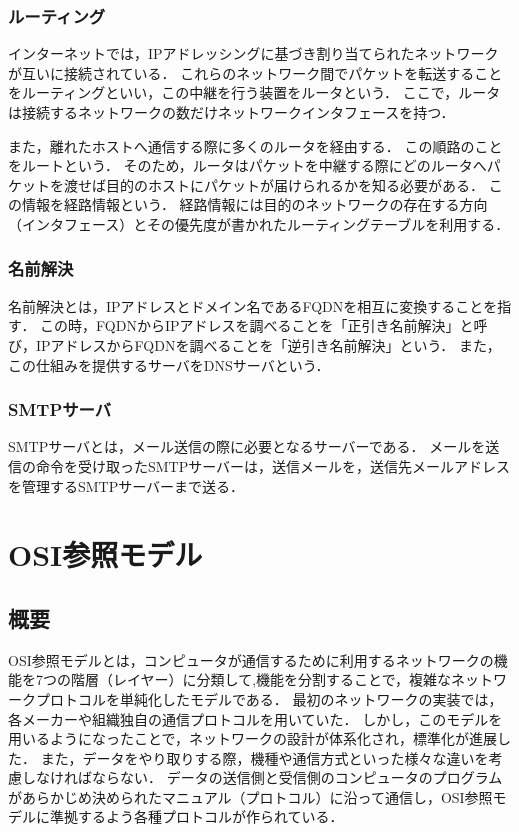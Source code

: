\documentclass[12pt,a4j,titlepage]{ltjsarticle}
\begin{document}
\subsubsection{ルーティング}
インターネットでは，IPアドレッシングに基づき割り当てられたネットワークが互いに接続されている．
これらのネットワーク間でパケットを転送することをルーティングといい，この中継を行う装置をルータという．
ここで，ルータは接続するネットワークの数だけネットワークインタフェースを持つ．

また，離れたホストへ通信する際に多くのルータを経由する．
この順路のことをルートという．
そのため，ルータはパケットを中継する際にどのルータへパケットを渡せば目的のホストにパケットが届けられるかを知る必要がある．
この情報を経路情報という．
経路情報には目的のネットワークの存在する方向（インタフェース）とその優先度が書かれたルーティングテーブルを利用する．

\subsubsection{名前解決}
名前解決とは，IPアドレスとドメイン名であるFQDNを相互に変換することを指す．
この時，FQDNからIPアドレスを調べることを「正引き名前解決」と呼び，IPアドレスからFQDNを調べることを「逆引き名前解決」という．
また，この仕組みを提供するサーバをDNSサーバという．

\subsubsection{SMTPサーバ}
SMTPサーバとは，メール送信の際に必要となるサーバーである．
メールを送信の命令を受け取ったSMTPサーバーは，送信メールを，送信先メールアドレスを管理するSMTPサーバーまで送る．




\section{OSI参照モデル}
\subsection{概要}
OSI参照モデルとは，コンピュータが通信するために利用するネットワークの機能を7つの階層（レイヤー）に分類して,機能を分割することで，複雑なネットワークプロトコルを単純化したモデルである．
最初のネットワークの実装では，各メーカーや組織独自の通信プロトコルを用いていた．
しかし，このモデルを用いるようになったことで，ネットワークの設計が体系化され，標準化が進展した．
また，データをやり取りする際，機種や通信方式といった様々な違いを考慮しなければならない．
データの送信側と受信側のコンピュータのプログラムがあらかじめ決められたマニュアル（プロトコル）に沿って通信し，OSI参照モデルに準拠するよう各種プロトコルが作られている．
\end{document}
